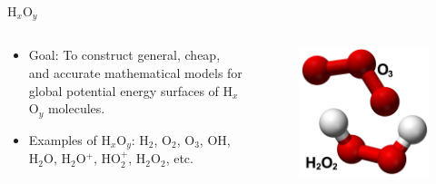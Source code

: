\documentclass{beamer}
\begin{document}
\begin{frame}{H$_x$O$_y$}
    \begin{columns}
        \begin{column}{0.5\textwidth}
            \begin{itemize}
                \item Goal: To construct general, cheap, and accurate mathematical models for global potential energy surfaces of H$_x$O$_y$ molecules.
                \item Examples of H$_x$O$_y$: H$_2$, O$_2$, O$_3$, OH, H$_2$O, H$_2$O$^+$, HO$_2^+$, H$_2$O$_2$, etc.
            \end{itemize}
        \end{column}
        \begin{column}{0.5\textwidth}
            \begin{figure}[htbp]
                \centering
                \includegraphics[scale=0.3]{img/slide/ozone.png}
                \label{fig:ozone}
            \end{figure}
        \end{column}
    \end{columns}
\end{frame}
\end{document}
